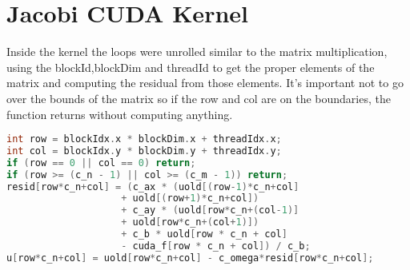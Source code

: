 \documentclass[a4paper]{article}
\begin{document}
\section*{Jacobi CUDA Kernel}
Inside the kernel the loops were unrolled similar to the matrix multiplication, using the blockId,blockDim and threadId to get the proper elements of the matrix and computing the residual from those elements. It's important not to go over the bounds of the matrix so if the row and col are on the boundaries, the function returns without computing anything.
\begin{lstlisting}[language=C++]
int row = blockIdx.x * blockDim.x + threadIdx.x;
int col = blockIdx.y * blockDim.y + threadIdx.y;
if (row == 0 || col == 0) return;
if (row >= (c_n - 1) || col >= (c_m - 1)) return;
resid[row*c_n+col] = (c_ax * (uold[(row-1)*c_n+col]
  					+ uold[(row+1)*c_n+col])
  					+ c_ay * (uold[row*c_n+(col-1)]
  					+ uold[row*c_n+(col+1)])
  					+ c_b * uold[row * c_n + col] 
  					- cuda_f[row * c_n + col]) / c_b;
u[row*c_n+col] = uold[row*c_n+col] - c_omega*resid[row*c_n+col];
\end{lstlisting}


\pagebreak
\end{document}

